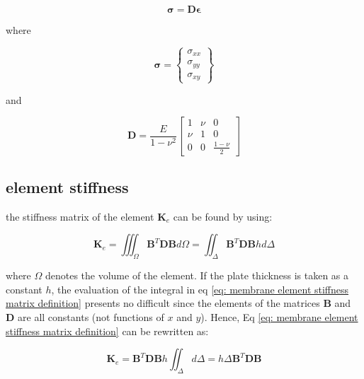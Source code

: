 \begin{equation}\label{eq: stress-strain relation of plane stress}
\mathbf{\sigma} = \mathbf{D} \mathbf{\epsilon}
\end{equation}

where

\begin{equation}
\mathbf{\sigma} = \left\lbrace \begin{array}{c}
\sigma_{xx} \\ 
\sigma_{yy} \\ 
\sigma_{xy}
\end{array}  \right\rbrace
\end{equation}

and

\begin{equation}\label{eq: stress-strain relation of plane stress}
\mathbf{D} = \frac{E}{1-\nu^2} \begin{bmatrix}
1 & \nu & 0 \\ 
\nu & 1 & 0 \\ 
0 & 0 & \frac{1-\nu}{2}
\end{bmatrix} 
\end{equation}

\subsection{element stiffness}
the stiffness matrix of the element $ \mathbf{K}_e $ can be found by using:

\begin{equation}\label{eq: membrane element stiffness matrix definition}
\mathbf{K}_e=\iiint_\Omega \mathbf{B}^T \mathbf{DB} d\Omega = \iint_\Delta \mathbf{B}^T \mathbf{DB} h d\Delta
\end{equation}

where $ \Omega $ denotes the volume of the element. If the plate thickness is taken as a constant $ h $, the evaluation of the integral in eq \ref{eq: membrane element stiffness matrix definition} presents no difficult since the elements of the matrices $ \mathbf{B} $ and $ \mathbf{D} $ are all constants (not functions of $ x $ and $ y $). Hence, Eq \ref{eq: membrane element stiffness matrix definition} can be rewritten as:

\begin{equation}\label{eq: memrane element stiffness matrix}
\mathbf{K}_e = \mathbf{B}^T \mathbf{DB} h \iint_\Delta   d\Delta =  h\Delta \mathbf{B}^T \mathbf{DB}
\end{equation}

